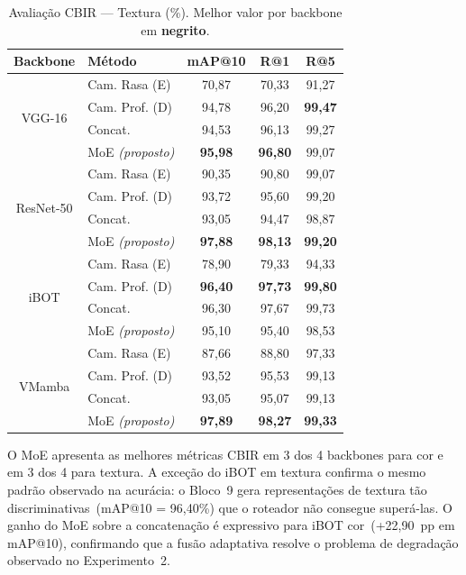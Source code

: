 \documentclass[letterpaper, 10 pt, conference]{ieeeconf}
\begin{document}
\begin{table}[htbp]
\caption{Avaliação CBIR --- Textura (\%). Melhor valor por backbone em
         \textbf{negrito}.}
\begin{center}
\begin{tabular}{c|l|c|c|c}
\hline
\textbf{Backbone} & \textbf{Método} & \textbf{mAP@10}
                  & \textbf{R@1} & \textbf{R@5} \\
\hline
\multirow{4}{*}{VGG-16}
  & Cam. Rasa (E)           & 70,87 & 70,33 & 91,27 \\
  & Cam. Prof. (D)          & 94,78 & 96,20 & \textbf{99,47} \\
  & Concat.                 & 94,53 & 96,13 & 99,27 \\
  & MoE \textit{(proposto)} & \textbf{95,98} & \textbf{96,80} & 99,07 \\
\hline
\multirow{4}{*}{ResNet-50}
  & Cam. Rasa (E)           & 90,35 & 90,80 & 99,07 \\
  & Cam. Prof. (D)          & 93,72 & 95,60 & 99,20 \\
  & Concat.                 & 93,05 & 94,47 & 98,87 \\
  & MoE \textit{(proposto)} & \textbf{97,88} & \textbf{98,13} & \textbf{99,20} \\
\hline
\multirow{4}{*}{iBOT}
  & Cam. Rasa (E)           & 78,90 & 79,33 & 94,33 \\
  & Cam. Prof. (D)          & \textbf{96,40} & \textbf{97,73} & \textbf{99,80} \\
  & Concat.                 & 96,30 & 97,67 & 99,73 \\
  & MoE \textit{(proposto)} & 95,10 & 95,40 & 98,53 \\
\hline
\multirow{4}{*}{VMamba}
  & Cam. Rasa (E)           & 87,66 & 88,80 & 97,33 \\
  & Cam. Prof. (D)          & 93,52 & 95,53 & 99,13 \\
  & Concat.                 & 93,05 & 95,07 & 99,13 \\
  & MoE \textit{(proposto)} & \textbf{97,89} & \textbf{98,27} & \textbf{99,33} \\
\hline
\end{tabular}
\label{tab_cbir_texture}
\end{center}
\end{table}

O MoE apresenta as melhores métricas CBIR em 3 dos 4 backbones para cor
e em 3 dos 4 para textura.
A exceção do iBOT em textura confirma o mesmo padrão observado na acurácia:
o Bloco~9 gera representações de textura tão discriminativas~(mAP@10 =
96,40\%) que o roteador não consegue superá-las.
O ganho do MoE sobre a concatenação é expressivo para iBOT cor~(+22,90~pp
em mAP@10), confirmando que a fusão adaptativa resolve o problema de
degradação observado no Experimento~2.
\end{document}

